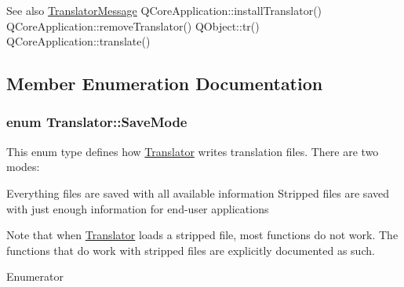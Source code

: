 \begin{DoxySeeAlso}{See also}
\hyperlink{classTranslatorMessage}{Translator\+Message} Q\+Core\+Application\+::install\+Translator() Q\+Core\+Application\+::remove\+Translator() Q\+Object\+::tr() Q\+Core\+Application\+::translate() 
\end{DoxySeeAlso}


\subsection{Member Enumeration Documentation}
\hypertarget{classTranslator_aefe656fdfa14952a99d6d25e61749a99}{}
\subsubsection[{Save\+Mode}]{\setlength{\rightskip}{0pt plus 5cm}enum {\bf Translator\+::\+Save\+Mode}}\label{classTranslator_aefe656fdfa14952a99d6d25e61749a99}
This enum type defines how \hyperlink{classTranslator}{Translator} writes translation files. There are two modes\+:

Everything files are saved with all available information  Stripped files are saved with just enough information for end-\/user applications

Note that when \hyperlink{classTranslator}{Translator} loads a stripped file, most functions do not work. The functions that do work with stripped files are explicitly documented as such. \begin{Desc}
\item[Enumerator]\par
\begin{description}
\item[{\em 
\hypertarget{classTranslator_aefe656fdfa14952a99d6d25e61749a99a3847cfbd6836d9a65ac73fc641bb3085}{}Everything\label{classTranslator_aefe656fdfa14952a99d6d25e61749a99a3847cfbd6836d9a65ac73fc641bb3085}
}]\item[{\em 
\hypertarget{classTranslator_aefe656fdfa14952a99d6d25e61749a99a68d586d3f7ea596c2a5d1252fad326d6}{}Stripped\label{classTranslator_aefe656fdfa14952a99d6d25e61749a99a68d586d3f7ea596c2a5d1252fad326d6}
}]\end{description}
\end{Desc}


